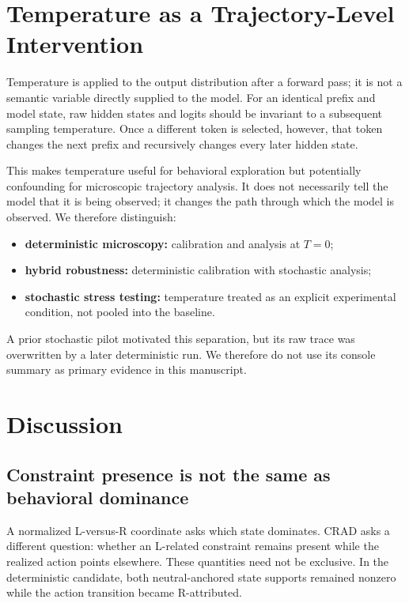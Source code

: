 \documentclass[10pt]{article}
\newcommand{\CRAD}{\textsc{CRAD}}
\begin{document}
\section{Temperature as a Trajectory-Level Intervention}

Temperature is applied to the output distribution after a forward pass; it is not a semantic variable directly supplied to the model. For an identical prefix and model state, raw hidden states and logits should be invariant to a subsequent sampling temperature. Once a different token is selected, however, that token changes the next prefix and recursively changes every later hidden state.

This makes temperature useful for behavioral exploration but potentially confounding for microscopic trajectory analysis. It does not necessarily tell the model that it is being observed; it changes the path through which the model is observed. We therefore distinguish:
\begin{itemize}
  \item \textbf{deterministic microscopy:} calibration and analysis at $T=0$;
  \item \textbf{hybrid robustness:} deterministic calibration with stochastic analysis;
  \item \textbf{stochastic stress testing:} temperature treated as an explicit experimental condition, not pooled into the baseline.
\end{itemize}
A prior stochastic pilot motivated this separation, but its raw trace was overwritten by a later deterministic run. We therefore do not use its console summary as primary evidence in this manuscript.

\section{Discussion}

\subsection{Constraint presence is not the same as behavioral dominance}

A normalized L-versus-R coordinate asks which state dominates. \CRAD{} asks a different question: whether an L-related constraint remains present while the realized action points elsewhere. These quantities need not be exclusive. In the deterministic candidate, both neutral-anchored state supports remained nonzero while the action transition became R-attributed.
\end{document}
